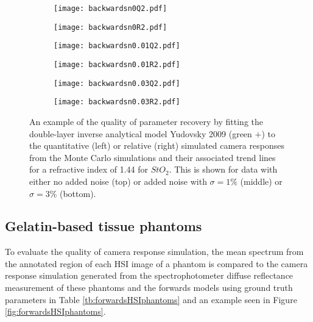 \begin{figure}[h!]
    \centering
    \begin{subfigure}{0.49\textwidth}
        \texttt{[image: backwardsn0Q2.pdf]}
        \caption{}
        \label{fig:backwardsn0Q2}
    \end{subfigure}
    \begin{subfigure}{0.49\textwidth}
        \texttt{[image: backwardsn0R2.pdf]}
        \caption{}
        \label{fig:backwardsn0R2}
    \end{subfigure}
    \begin{subfigure}{0.49\textwidth}
        \texttt{[image: backwardsn0.01Q2.pdf]}
        \caption{}
        \label{fig:backwardsn0.01Q2}
    \end{subfigure}
    \begin{subfigure}{0.49\textwidth}
        \texttt{[image: backwardsn0.01R2.pdf]}
        \caption{}
        \label{fig:backwardsm0.01R2}
    \end{subfigure}
    \begin{subfigure}{0.49\textwidth}
        \texttt{[image: backwardsn0.03Q2.pdf]}
        \caption{}
        \label{fig:backwardsn0.03Q2}
    \end{subfigure}
    \begin{subfigure}{0.49\textwidth}
        \texttt{[image: backwardsn0.03R2.pdf]}
        \caption{}
        \label{fig:backwardsm0.03R2}
    \end{subfigure}
    \caption{An example of the quality of parameter recovery by fitting the double-layer inverse analytical model Yudovsky 2009 (\textcolor{MyGreen}{green $+$}) to the quantitative (left) or relative (right) simulated camera responses from the Monte Carlo simulations and their associated trend lines for a refractive index of 1.44 for $StO_2$. This is shown for data with either no added noise (top) or added noise with $\sigma = 1\%$ (middle) or $\sigma = 3\%$ (bottom).}
    \label{fig:backwardsHSIMC2}
\end{figure}
\FloatBarrier

\subsection{Gelatin-based tissue phantoms}
To evaluate the quality of camera response simulation, the mean spectrum from the annotated region of each HSI image of a phantom is compared to the camera response simulation generated from the spectrophotometer diffuse reflectance measurement of these phantoms and the forwards models using ground truth parameters in Table \ref{tb:forwardsHSIphantoms} and an example seen in Figure \ref{fig:forwardsHSIphantoms}. 

